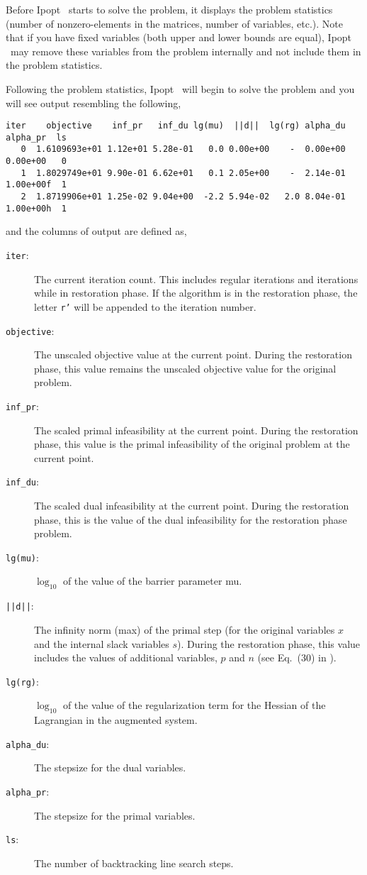 \documentclass[10pt]{article}
\newcommand{\Ipopt}{{\sc Ipopt }}
\begin{document}
Before \Ipopt\ starts to solve the problem, it displays the problem
statistics (number of nonzero-elements in the matrices, number of
variables, etc.). Note that if you have fixed variables (both upper
and lower bounds are equal), \Ipopt\ may remove these variables from
the problem internally and not include them in the problem statistics.

Following the problem statistics, \Ipopt\ will begin to solve the
problem and you will see output resembling the following,
\begin{verbatim}
iter    objective    inf_pr   inf_du lg(mu)  ||d||  lg(rg) alpha_du alpha_pr  ls
   0  1.6109693e+01 1.12e+01 5.28e-01   0.0 0.00e+00    -  0.00e+00 0.00e+00   0
   1  1.8029749e+01 9.90e-01 6.62e+01   0.1 2.05e+00    -  2.14e-01 1.00e+00f  1
   2  1.8719906e+01 1.25e-02 9.04e+00  -2.2 5.94e-02   2.0 8.04e-01 1.00e+00h  1
\end{verbatim}
and the columns of output are defined as,
\begin{description}
\item[{\tt iter}:] The current iteration count. This includes regular
  iterations and iterations while in restoration phase. If the
  algorithm is in the restoration phase, the letter {\tt r'} will be
  appended to the iteration number.
\item[{\tt objective}:] The unscaled objective value at the current
  point. During the restoration phase, this value remains the unscaled
  objective value for the original problem.
\item[{\tt inf\_pr}:] The scaled primal infeasibility at the current
  point. During the restoration phase, this value is the primal
  infeasibility of the original problem at the current point.
\item[{\tt inf\_du}:] The scaled dual infeasibility at the current
  point. During the restoration phase, this is the value of the dual
  infeasibility for the restoration phase problem.
\item[{\tt lg(mu)}:] $\log_{10}$ of the value of the barrier parameter mu.
\item[{\tt ||d||}:] The infinity norm (max) of the primal step (for
  the original variables $x$ and the internal slack variables $s$).
  During the restoration phase, this value includes the values of
  additional variables, $p$ and $n$ (see Eq.~(30) in
  \cite{WaecBieg06:mp}).
\item[{\tt lg(rg)}:] $\log_{10}$ of the value of the regularization
  term for the Hessian of the Lagrangian in the augmented system.
\item[{\tt alpha\_du}:] The stepsize for the dual variables.
\item[{\tt alpha\_pr}:] The stepsize for the primal variables.
\item[{\tt ls}:] The number of backtracking line search steps.
\end{description}
\end{document}
